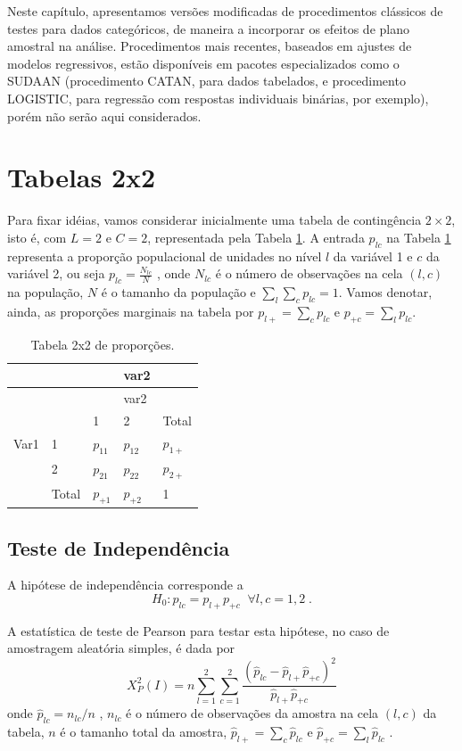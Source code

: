 \documentclass[]{book}
\theoremstyle{definition}
\theoremstyle{definition}
\theoremstyle{definition}
\theoremstyle{remark}
\begin{document}
Neste capítulo, apresentamos versões modificadas de procedimentos
clássicos de testes para dados categóricos, de maneira a incorporar os
efeitos de plano amostral na análise. Procedimentos mais recentes,
baseados em ajustes de modelos regressivos, estão disponíveis em pacotes
especializados como o SUDAAN (procedimento CATAN, para dados tabelados,
e procedimento LOGISTIC, para regressão com respostas individuais
binárias, por exemplo), porém não serão aqui considerados.

\section{Tabelas 2x2}\label{tabelas22}

Para fixar idéias, vamos considerar inicialmente uma tabela de
contingência \(2\times 2\), isto é, com \(L=2\) e \(C=2\), representada
pela Tabela \ref{tab:tab81}. A entrada \(p_{lc}\) na Tabela
\ref{tab:tab81} representa a proporção populacional de unidades no nível
\(l\) da variável 1 e \(c\) da variável 2, ou seja
\(p_{lc}=\frac{N_{lc}}{N}\) , onde \(N_{lc}\) é o número de observações
na cela \(\left( l,c\right)\) na população, \(N\) é o tamanho da
população e \(\sum\nolimits_{l}\sum\nolimits_{c}p_{lc}=1\). Vamos
denotar, ainda, as proporções marginais na tabela por
\(p_{l+}=\sum\nolimits_{c}p_{lc}\) e \(p_{+c}=\sum_{l}p_{lc}\).

\begin{longtable}[]{@{}lllll@{}}
\caption{\label{tab:tab81} Tabela 2x2 de proporções.}\tabularnewline
\toprule
& & & var2 &\tabularnewline
\midrule
\endfirsthead
\toprule
& & & var2 &\tabularnewline
\midrule
\endhead
& & 1 & 2 & Total\tabularnewline
Var1 & 1 & \(p_{11}\) & \(p_{12}\) & \(p_{1+}\)\tabularnewline
& 2 & \(p_{21}\) & \(p_{22}\) & \(p_{2+}\)\tabularnewline
& Total & \(p_{+1}\) & \(p_{+2}\) & 1\tabularnewline
\bottomrule
\end{longtable}

\subsection{Teste de Independência}\label{teste-de-independencia}

A hipótese de independência corresponde a \[
H_{0}:p_{lc}=p_{l+}p_{+c}\;\;\forall l,c=1,2\;. 
\]

A estatística de teste de Pearson para testar esta hipótese, no caso de
amostragem aleatória simples, é dada por \[
X_{P}^{2}\left( I\right) =n\sum\limits_{l=1}^{2}\sum\limits_{c=1}^{2}\frac{
\left( \hat{p}_{lc}-\hat{p}_{l+}\hat{p}_{+c}\right) ^{2}}{\hat{p}_{l+}\hat{p}
_{+c}} 
\] onde \(\hat{p}_{lc}=n_{lc}/n\) , \(n_{lc}\) é o número de observações
da amostra na cela \(\left( l,c\right)\) da tabela, \(n\) é o tamanho
total da amostra, \(\hat{p}_{l+}=\sum\nolimits_{c}\widehat{p}_{lc}\) e
\(\hat{p}_{+c}=\sum_{l}\hat{p}_{lc}\) .
\end{document}
